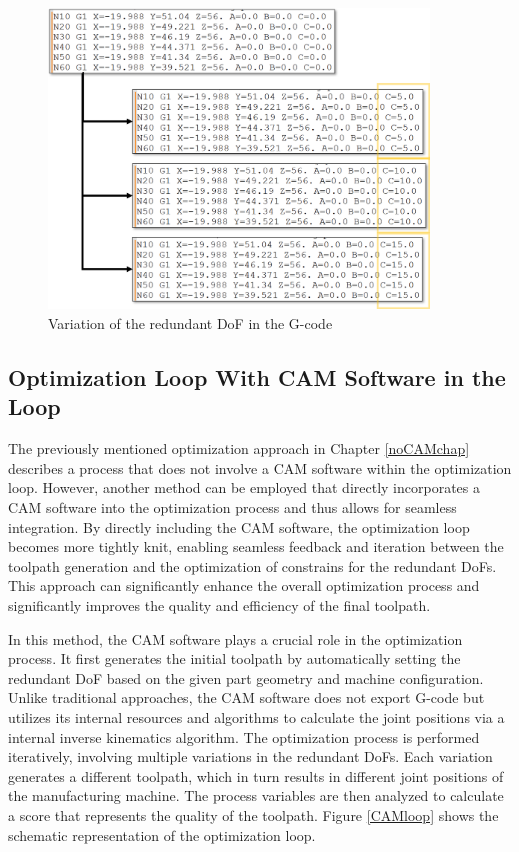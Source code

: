 \begin{figure}[H]
	\centerline{\includegraphics[width=0.9\textwidth]{figures/gcodevariation.png}}
	\caption{Variation of the redundant DoF in the G-code}
	\label{variation}
\end{figure}

\newpage
\subsection{Optimization Loop With CAM Software in the Loop}\label{CAMinloop}

The previously mentioned optimization approach in Chapter \ref{noCAMchap} describes a process that does not involve a \acrshort{CAM} software within the optimization loop. However, another method can be employed that directly incorporates a \acrshort{CAM} software into the optimization process and thus allows for seamless integration. By directly including the \acrshort{CAM} software, the optimization loop becomes more tightly knit, enabling seamless feedback and iteration between the toolpath generation and the optimization of constrains for the redundant \acrshort{DoF}s. This approach can significantly enhance the overall optimization process and significantly improves the quality and efficiency of the final toolpath.


In this method, the \acrshort{CAM} software plays a crucial role in the optimization process. It first generates the initial toolpath by automatically setting the redundant \acrshort{DoF} based on the given part geometry and machine configuration. Unlike traditional approaches, the \acrshort{CAM} software does not export G-code but utilizes its internal resources and algorithms to calculate the joint positions via a internal inverse kinematics algorithm. The optimization process is performed iteratively, involving multiple variations in the redundant \acrshort{DoF}s. Each variation generates a different toolpath, which in turn results in different joint positions of the manufacturing machine. The process variables are then analyzed to calculate a score that represents the quality of the toolpath. Figure \ref{CAMloop} shows the schematic representation of the optimization loop.\newline

